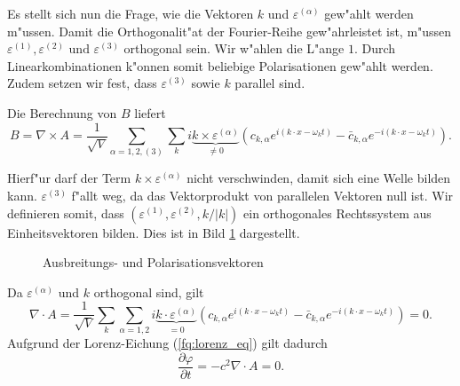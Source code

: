 \begin{refsection}
Es stellt sich nun die Frage, wie die Vektoren $k$ und $\varepsilon^{(\alpha)}$ gew"ahlt werden m"ussen. Damit die Orthogonalit"at der Fourier-Reihe gew"ahrleistet ist, m"ussen $\varepsilon^{(1)}, \varepsilon^{(2)} \text{ und } \varepsilon^{(3)}$ orthogonal sein. Wir w"ahlen die L"ange $1$. Durch Linearkombinationen k"onnen somit beliebige Polarisationen gew"ahlt werden. Zudem setzen wir fest, dass $\varepsilon^{(3)}$ sowie $k$ parallel sind.

Die Berechnung von $B$ liefert
\begin{equation*}
B = \nabla \times A = \frac{1}{ \sqrt{V}} \sum_{\alpha=1,2,(3)}  \sum_k i \underbrace{k \times \varepsilon^{(\alpha)}}_{\neq 0} \left(c_{k,\alpha} e^{i (k \cdot x - \omega_k t)} - \bar{c}_{k,\alpha} e^{-i(k \cdot x - \omega_k t)} \right).
\end{equation*}

Hierf"ur darf der Term $k \times \varepsilon^{(\alpha)}$ nicht verschwinden, damit sich eine Welle bilden kann. $\varepsilon^{(3)}$ f"allt weg, da das Vektorprodukt von parallelen Vektoren null ist. Wir definieren somit, dass $(\varepsilon^{(1)}, \varepsilon^{(2)} , k/|k|)$ ein orthogonales Rechtssystem aus Einheitsvektoren bilden. Dies ist in Bild \ref{fq_img:field_vect} dargestellt.

\begin{figure}
	\centering
	\caption{Ausbreitungs- und Polarisationsvektoren
		\label{fq_img:field_vect}}
\end{figure}

Da $\varepsilon^{(\alpha)}$ und $k$ orthogonal sind, gilt
\begin{equation*}
\nabla \cdot A = \frac{1}{\sqrt{V}} \sum_k \sum_{\alpha=1,2} i \underbrace{k \cdot \varepsilon^{(\alpha)}}_{=0} \left(c_{k,\alpha} e^{i (k \cdot x - \omega_k t)} - \bar{c}_{k,\alpha} e^{-i(k \cdot x - \omega_k t)}\right) = 0.
\end{equation*}
Aufgrund der Lorenz-Eichung (\ref{fq:lorenz_eq}) gilt dadurch
\begin{equation*}
\frac{\partial \varphi }{\partial t} = - c^2 \nabla \cdot A = 0.
\end{equation*}


\end{refsection}
